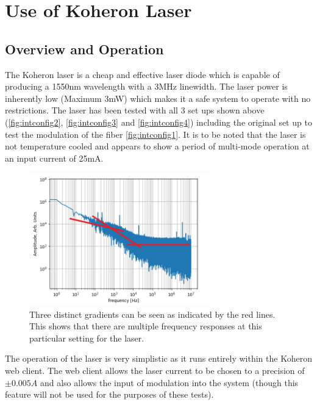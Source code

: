 \documentclass[12pt,a4paper,oneside]{report}
\begin{document}
\chapter{Use of Koheron Laser}
\section{Overview and Operation}
The Koheron laser is a cheap and effective laser diode which is capable of producing a 1550nm wavelength with a 3MHz linewidth. The laser power is inherently low (Maximum 3mW) which makes it a safe system to operate with no restrictions. The laser has been tested with all 3 set ups shown above (\autoref{fig:intconfig2}, \autoref{fig:intconfig3} and \autoref{fig:intconfig4}) including the original set up to test the modulation of the fiber \autoref{fig:intconfig1}. It is to be noted that the laser is not temperature cooled and appears to show a period of multi-mode operation at an input current of 25mA.

\begin{figure}[H] 
\includegraphics[width=0.7\textwidth, center,angle=0]{DImages/FFT_for_shot_8_Date_20180323.png}
\caption{Three distinct gradients can be seen as indicated by the red lines. This shows that there are multiple frequency responses at this particular setting for the laser. } 
\label{fig:25mAmultimode}
\end{figure}

The operation of the laser is very simplistic as it runs entirely within the Koheron web client. The web client allows the laser current to be chosen to a precision of $\pm 0.005A$ and also allows the input of modulation into the system (though this feature will not be used for the purposes of these tests).
\end{document}
